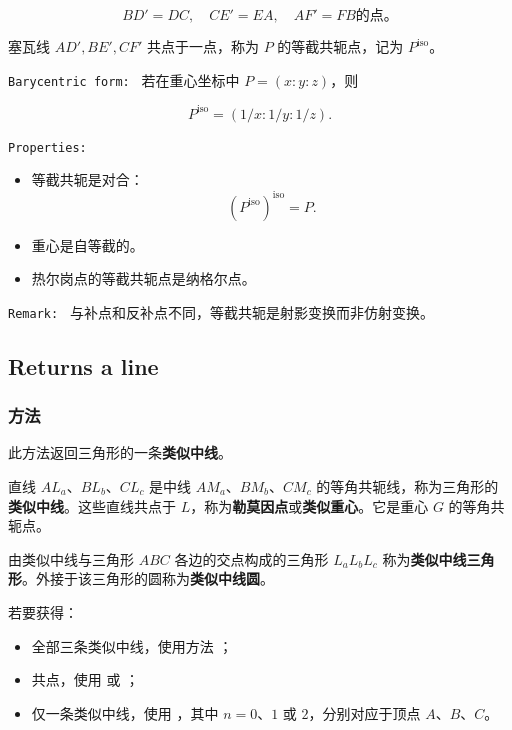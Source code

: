 \[
BD'=DC,\quad CE'=EA,\quad AF'=FB 的点。
\]

塞瓦线 $AD',BE',CF'$ 共点于一点，称为 $P$ 的等截共轭点，记为 $P^{\mathrm{iso}}$。

\texttt{Barycentric form: }
若在重心坐标中 $P=(x:y:z)$，则

\[
P^{\mathrm{iso}}=(1/x:1/y:1/z).
\]

\texttt{Properties: }
\begin{itemize}
\item 等截共轭是对合：
\[
(P^{\mathrm{iso}})^{\mathrm{iso}}=P.
\]
\item 重心是自等截的。
\item 热尔岗点的等截共轭点是纳格尔点。
\end{itemize}


\texttt{Remark: }
与补点和反补点不同，等截共轭是射影变换而非仿射变换。

\subsection{Returns  a line}
\subsubsection{方法 }
\label{ssub:method_imeth_triangle_symmedian__line}

此方法返回三角形的一条\textbf{类似中线}。

\medskip

直线 $AL_a$、$BL_b$、$CL_c$ 是中线 $AM_a$、$BM_b$、$CM_c$ 的等角共轭线，称为三角形的\textbf{类似中线}。这些直线共点于 $L$，称为\textbf{勒莫因点}或\textbf{类似重心}。它是重心 $G$ 的等角共轭点。

\medskip

由类似中线与三角形 $ABC$ 各边的交点构成的三角形 $L_aL_bL_c$ 称为\textbf{类似中线三角形}。外接于该三角形的圆称为\textbf{类似中线圆}。

\medskip

若要获得：
\begin{itemize}
  \item 全部三条类似中线，使用方法 ；
  \item 共点，使用  或 ；
  \item 仅一条类似中线，使用 ，其中 \(n=0\)、\(1\) 或 \(2\)，分别对应于顶点 $A$、$B$、$C$。
\end{itemize}

